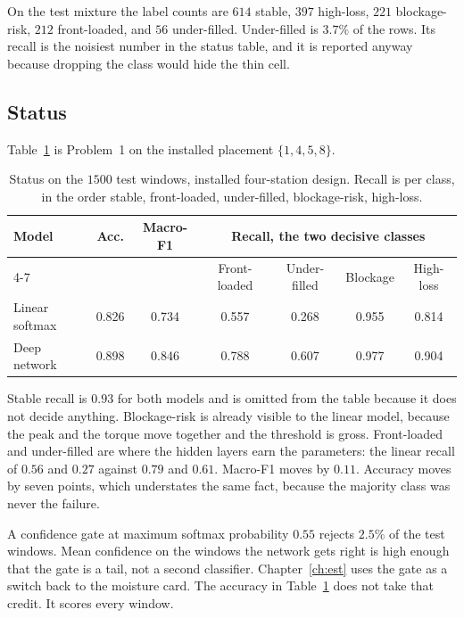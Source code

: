 On the test mixture the label counts are \(614\) stable, \(397\) high-loss, \(221\) blockage-risk, \(212\) front-loaded, and \(56\) under-filled. Under-filled is \(3.7\%\) of the rows. Its recall is the noisiest number in the status table, and it is reported anyway because dropping the class would hide the thin cell.

\subsection{Status}

Table~\ref{tab:status} is Problem~1 on the installed placement \(\{1,4,5,8\}\).

\begin{table}[ht]
\centering
\caption{Status on the \(1500\) test windows, installed four-station design. Recall is per class, in the order stable, front-loaded, under-filled, blockage-risk, high-loss.}
\label{tab:status}
\begin{tabular}{@{}lcccccc@{}}
\toprule
Model & Acc. & Macro-F1 & \multicolumn{4}{c}{Recall, the two decisive classes} \\
\cmidrule(lr){4-7}
& & & Front-loaded & Under-filled & Blockage & High-loss \\
\midrule
Linear softmax & 0.826 & 0.734 & 0.557 & 0.268 & 0.955 & 0.814 \\
Deep network   & 0.898 & 0.846 & 0.788 & 0.607 & 0.977 & 0.904 \\
\bottomrule
\end{tabular}
\end{table}

Stable recall is \(0.93\) for both models and is omitted from the table because it does not decide anything. Blockage-risk is already visible to the linear model, because the peak and the torque move together and the threshold is gross. Front-loaded and under-filled are where the hidden layers earn the parameters: the linear recall of \(0.56\) and \(0.27\) against \(0.79\) and \(0.61\). Macro-F1 moves by \(0.11\). Accuracy moves by seven points, which understates the same fact, because the majority class was never the failure.

A confidence gate at maximum softmax probability \(0.55\) rejects \(2.5\%\) of the test windows. Mean confidence on the windows the network gets right is high enough that the gate is a tail, not a second classifier. Chapter~\ref{ch:est} uses the gate as a switch back to the moisture card. The accuracy in Table~\ref{tab:status} does not take that credit. It scores every window.


